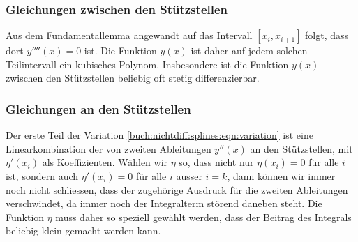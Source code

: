 %
%
\subsubsection{Gleichungen zwischen den Stützstellen}
Aus dem Fundamentallemma angewandt auf das Intervall $[x_i,x_{i+1}]$
folgt, dass dort $y''''(x)=0$ ist.
Die Funktion $y(x)$ ist daher auf jedem solchen Teilintervall ein
kubisches Polynom.
Insbesondere ist die Funktion $y(x)$ zwischen den Stützstellen 
beliebig oft stetig differenzierbar.

%
%
\subsubsection{Gleichungen an den Stützstellen}
Der erste Teil der Variation 
\eqref{buch:nichtdiff:splines:eqn:variation}
ist eine Linearkombination der von zweiten Ableitungen $y''(x)$ an
den Stützstellen, mit $\eta'(x_i)$ als Koeffizienten.
Wählen wir $\eta$ so, dass nicht nur $\eta(x_i)=0$ für alle $i$ ist,
sondern auch $\eta'(x_i)=0$ für alle $i$ ausser $i=k$, dann können
wir immer noch nicht schliessen, dass der zugehörige Ausdruck für
die zweiten Ableitungen verschwindet, da immer noch der Integralterm
störend daneben steht.
Die Funktion $\eta$ muss daher so speziell gewählt werden, dass
der Beitrag des Integrals beliebig klein gemacht werden kann.

